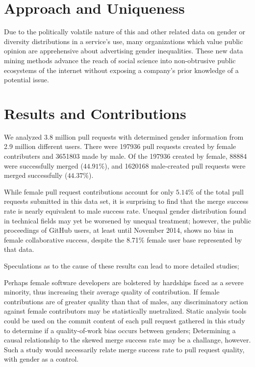 \documentclass{sigplanconf}
\begin{document}
\section{Approach and Uniqueness}
Due to the politically volatile nature of this and other related data on gender
or diversity distributions in a service's use, many organizations which value
public opinion are apprehensive about advertising gender inequalities. These new data
mining methods advance the reach of social science into non-obtrusive public
ecosystems of the internet without exposing a company's prior knowledge of a
potential issue.

\section{Results and Contributions}
We analyzed 3.8 million pull requests with determined gender information from
2.9 million different users. There were 197936 pull requests created by female contributers and 3651803 made by
male. Of the 197936 created by female, 88884 were successfully merged
($44.91\%$), and 1620168 male-created pull requests
were merged successfully ($44.37\%$).

While female pull request contributions account for only $5.14\%$ of the total pull
requests submitted in this data set, it is surprising to find that the merge
success rate is nearly equivalent to male success rate. Unequal gender
distribution found in technical fields may yet be worsened by unequal treatment;
however, the public proceedings of GitHub users, at least until November 2014,
shows no bias in female collaborative success, despite the 8.71\% female
user base represented by that data.

Speculations as to the cause of these results can lead to more detailed studies;

Perhaps female software developers are bolstered by hardships faced as a severe
minority, thus increasing their average quality of contribution. If female
contributions are of greater quality than that of males, any discriminatory
action against female contributors may be statistically nuetralized. Static
analysis tools could be used on the commit content of each pull request gathered
in this study to determine if a quality-of-work bias occurs between genders;
Determining a causal relationship to the skewed merge success rate may be a
challange, however. Such a study would necessarily relate merge success rate to
pull request quality, with gender as a control.
\end{document}
